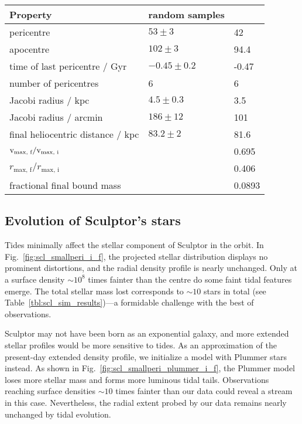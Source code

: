 \begin{table*}[t]
\centering
\caption[Simulation results for Sculptor’s dark matter]{The orbital and dark matter properties for the simulation of Sculptor. The random samples column shows the distributions from point orbits, and the \smallperi{} column contains the results from the N-body simulation. }
\label{tbl:scl_sim_results}
\begin{tabular}{lll}
\toprule
Property & random samples & \smallperi{}\\
\midrule
pericentre & $53\pm3$ & 42\\
apocentre & $102\pm3$ & 94.4\\
time of last pericentre / Gyr & $-0.45 \pm 0.2$ & -0.47\\
number of pericentres & 6 & 6\\
Jacobi radius / kpc & $4.5 \pm 0.3$ & 3.5\\
Jacobi radius / arcmin & $186\pm12$ & 101\\
final heliocentric distance / kpc & $83.2\pm2$ & 81.6\\
${\rm v}_\textrm{max, f} / {\rm v}_\textrm{max, i}$ &  & 0.695\\
$r_\textrm{max, f} / r_\textrm{max, i}$ &  & 0.406\\
fractional final bound mass &  & 0.0893\\
\bottomrule
\end{tabular}
\end{table*}

\subsection{Evolution of Sculptor's
stars}\label{evolution-of-sculptors-stars}

Tides minimally affect the stellar component of Sculptor in the
\smallperi{} orbit. In Fig.~\ref{fig:scl_smallperi_i_f}, the projected
stellar distribution displays no prominent distortions, and the radial
density profile is nearly unchanged. Only at a surface density
\(\sim10^8\) times fainter than the centre do some faint tidal features
emerge. The total stellar mass lost corresponds to \(\sim 10\) stars in
total (see Table~\ref{tbl:scl_sim_results})---a formidable challenge
with the best of observations.

Sculptor may not have been born as an exponential galaxy, and more
extended stellar profiles would be more sensitive to tides. As an
approximation of the present-day extended density profile, we initialize
a model with Plummer stars instead. As shown in
Fig.~\ref{fig:scl_smallperi_plummer_i_f}, the Plummer model loses more
stellar mass and forms more luminous tidal tails. Observations reaching
surface densities \(\sim10\) times fainter than our data could reveal a
stream in this case. Nevertheless, the radial extent probed by our data
remains nearly unchanged by tidal evolution.

